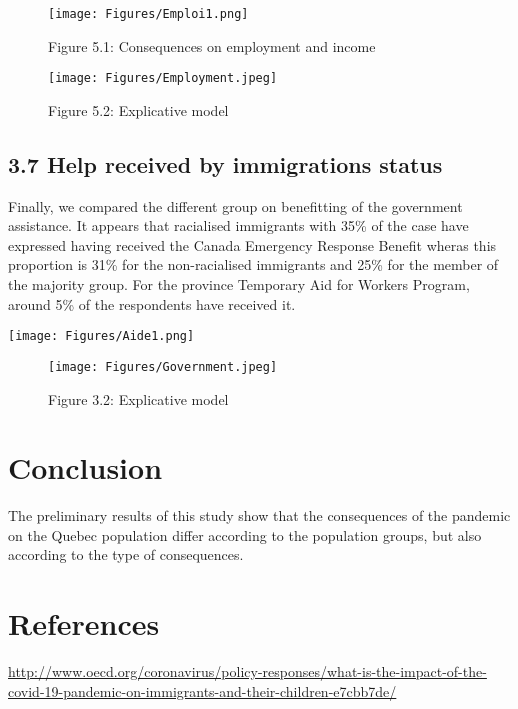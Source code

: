 \documentclass[
]{article}
\begin{document}
\begin{figure}
\centering
\texttt{[image: Figures/Emploi1.png]}
\caption{Figure 5.1: Consequences on employment and income}
\end{figure}

\begin{figure}
\centering
\texttt{[image: Figures/Employment.jpeg]}
\caption{Figure 5.2: Explicative model}
\end{figure}

\hypertarget{help-received-by-immigrations-status-1}{%
\subsection{3.7 Help received by immigrations status}\label{help-received-by-immigrations-status-1}}

Finally, we compared the different group on benefitting of the government
assistance. It appears that racialised immigrants with 35\% of the case have
expressed having received the Canada Emergency Response Benefit wheras this
proportion is 31\% for the non-racialised immigrants and 25\% for the member of
the majority group. For the province Temporary Aid for Workers Program, around
5\% of the respondents have received it.

\texttt{[image: Figures/Aide1.png]}

\begin{figure}
\centering
\texttt{[image: Figures/Government.jpeg]}
\caption{Figure 3.2: Explicative model}
\end{figure}

\newpage

\hypertarget{conclusion-1}{%
\section{Conclusion}\label{conclusion-1}}

The preliminary results of this study show that the consequences of the pandemic
on the Quebec population differ according to the population groups, but also
according to the type of consequences. \newpage

\hypertarget{references}{%
\section{References}\label{references}}

\url{http://www.oecd.org/coronavirus/policy-responses/what-is-the-impact-of-the-covid-19-pandemic-on-immigrants-and-their-children-e7cbb7de/}
\end{document}
